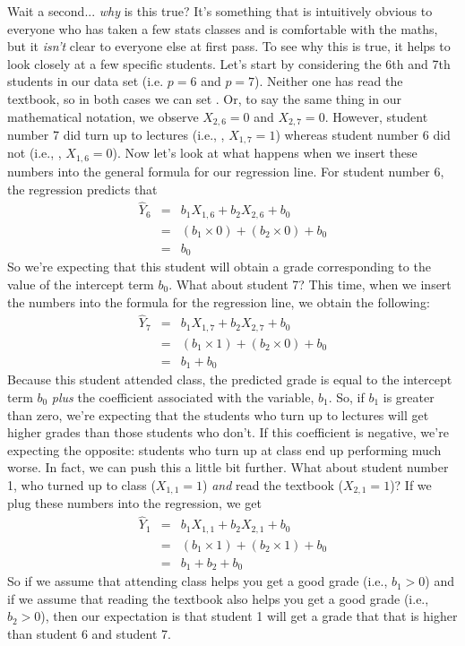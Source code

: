 Wait a second... {\it why} is this true? It's something that is intuitively obvious to everyone who has taken a few stats classes and is comfortable with the maths, but it {\it isn't} clear to everyone else at first pass. To see why this is true, it helps to look closely at a few specific students. Let's start by considering the 6th and 7th students in our data set (i.e. $p=6$ and $p=7$). Neither one has read the textbook, so in both cases we can set . Or, to say the same thing in our mathematical notation, we observe $X_{2,6} = 0$ and $X_{2,7} = 0$. However, student number 7 did turn up to lectures (i.e., , $X_{1,7} = 1$) whereas student number 6 did not (i.e., , $X_{1,6} = 0$). Now let's look at what happens when we insert these numbers into the general formula for our regression line. For student number 6, the regression predicts that
\begin{eqnarray*}
\hat{Y}_{6} &=& b_1 X_{1,6} + b_2 X_{2,6} + b_0 \\
&=&  (b_1 \times 0)  + ( b_2 \times 0)  + b_0 \\
&=&  b_0
\end{eqnarray*}
So we're expecting that this student will obtain a grade corresponding to the value of the intercept term $b_0$. What about student 7? This time, when we insert the numbers into the formula for the regression line, we obtain the following:
\begin{eqnarray*}
\hat{Y}_{7} &=& b_1 X_{1,7} + b_2 X_{2,7} + b_0 \\
&=&  (b_1 \times 1)  + ( b_2 \times 0)  + b_0 \\
&=&  b_1 + b_0
\end{eqnarray*}
Because this student attended class, the predicted grade is equal to the intercept term $b_0$ {\it plus} the coefficient associated with the  variable, $b_1$. So, if $b_1$ is greater than zero, we're expecting that the students who turn up to lectures will get higher grades than those students who don't. If this coefficient is negative, we're expecting the opposite: students who turn up at class end up performing much worse. In fact, we can push this a little bit further. What about student number 1, who turned up to class ($X_{1,1} = 1$) {\it and} read the textbook ($X_{2,1} = 1$)? If we plug these numbers into the regression, we get
\begin{eqnarray*}
\hat{Y}_{1} &=& b_1 X_{1,1} + b_2 X_{2,1} + b_0 \\
&=&  (b_1 \times 1)  + ( b_2 \times 1)  + b_0 \\
&=&  b_1 + b_2 + b_0
\end{eqnarray*}
So if we assume that attending class helps you get a good grade (i.e., $b_1 > 0$) and if we assume that reading the textbook also helps you get a good grade (i.e., $b_2 >0$), then our expectation is that student 1 will get a grade that that is higher than student 6 and student 7. 

